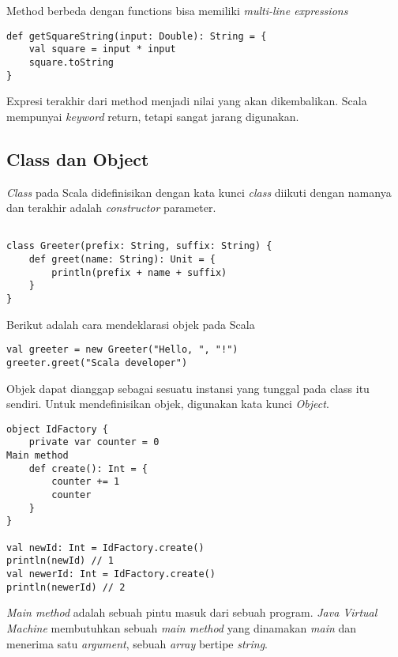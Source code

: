 Method berbeda dengan functions bisa memiliki \textit{multi-line expressions}

\begin{verbatim}
def getSquareString(input: Double): String = {
    val square = input * input
    square.toString
}
\end{verbatim}

Expresi terakhir dari method menjadi nilai yang akan dikembalikan. Scala mempunyai \textit{keyword} return, tetapi sangat jarang digunakan.

\subsection{Class dan Object}

\textit{Class} pada Scala didefinisikan dengan kata kunci \textit{class} diikuti dengan namanya dan terakhir adalah \textit{constructor} parameter.

\begin{verbatim}

class Greeter(prefix: String, suffix: String) {
    def greet(name: String): Unit = {
        println(prefix + name + suffix)
    }
}

\end{verbatim}



Berikut adalah cara mendeklarasi objek pada Scala
\begin{verbatim}
val greeter = new Greeter("Hello, ", "!")
greeter.greet("Scala developer")
\end{verbatim}

Objek dapat dianggap sebagai sesuatu instansi yang tunggal pada class itu sendiri. Untuk mendefinisikan objek, digunakan kata kunci \textit{Object}. 

\begin{verbatim}
object IdFactory {
    private var counter = 0
Main method
  	def create(): Int = {
        counter += 1
        counter
    }
}

val newId: Int = IdFactory.create()
println(newId) // 1
val newerId: Int = IdFactory.create()
println(newerId) // 2

\end{verbatim}

\textit{Main method} adalah sebuah pintu masuk dari sebuah program. \textit{Java Virtual Machine} membutuhkan sebuah \textit{main method} yang dinamakan \textit{main} dan menerima satu \textit{argument}, sebuah \textit{array} bertipe \textit{string}.\\

